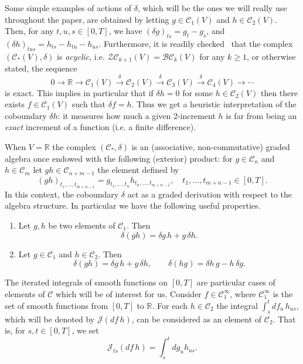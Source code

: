 \documentclass[a4paper,11pt,reqno]{article}
\newcommand{\cB}{\mathcal{B}}
\newcommand{\cZ}{\mathcal{Z}}
\newcommand{\ott}{[0,T]}
\newcommand{\1}{{\bf 1}}
\newcommand{\der}{\delta}
\newcommand{\RR}{\mathbb{R}}
\newcommand{\CC}{\mathcal{C}}
\newcommand{\R}{\mathbb R}
\newcommand{\cj}{\mathcal J}
\begin{document}
Some simple examples of actions of $\der$,
which will be the ones we will really use throughout the paper,
 are obtained by letting 
$g\in\CC_1(V)$ and $h\in\CC_2(V)$. Then, for any $t,u,s\in\ott$, we have
$
  (\der g)_{ts} = g_t - g_s $, and $
(\der h)_{tus} = h_{ts}-h_{tu}-h_{us}
$.
Furthermore, it is readily checked~\cite{MR2091358} that
the complex $(\CC_*(V),\delta)$ is \emph{acyclic}, i.e. 
$\cZ \CC_{k+1}(V) = \cB \CC_{k}(V)$ for any $k\ge 1$, or otherwise stated, 
the sequence
\begin{equation}
\label{eq:exact_sequence}
 0 \rightarrow \RR \rightarrow \CC_1(V)
 \stackrel{\der}{\longrightarrow} \CC_2(V) \stackrel{\der}{\longrightarrow} \CC_3(V) \stackrel{\der}{\longrightarrow} \CC_4(V) \rightarrow \cdots 
\end{equation}
is exact. 
This implies in particular that if $\der h = 0$ for some $h \in \CC_{2}(V)$ then there exists $f \in \CC_{1}(V)$ such that $\der f = h$.
 Thus we get a heuristic 
interpretation of the coboundary $\der h$:  it measures how much a
given 2-increment $h$  is far from being an {\it exact} increment of  a
function (i.e. a finite difference). 

\bigskip
When  $V=\R$ the complex $(\CC_*,\delta)$ is an (associative, non-commutative)
graded algebra once endowed with the following (exterior) product:
for  $g\in\CC_n $ and $h\in\CC_m $ let  $gh \in \CC_{n+m-1} $
the element defined by
\begin{equation}\label{cvpdt}
(gh)_{t_1,\dots,t_{m+n-1}}=
g_{t_1,\dots,t_{n}} h_{t_{n},\dots,t_{m+n-1}},
\quad
t_1,\dots,t_{m+n-1}\in\ott.
\end{equation}
In this context,
the coboundary $\delta$ act as a graded derivation with respect to the
algebra structure. In particular we have the following useful properties.
\begin{enumerate}
\item
Let $g,h$ be two elements of $\CC_1 $. Then
\begin{equation}\label{difrulu}
\der (gh) = \der g\,  h + g\, \der h.
\end{equation}
\item
Let $g \in \CC_1 $ and  $h\in \CC_2 $. Then
$$
\der (gh) = \der g\, h + g \,\der h, \qquad
\der (hg) = \der h\, g  - h \,\der g.
$$
\end{enumerate}
\bigskip

The iterated integrals of smooth functions on $\ott$ are 
particular cases of elements of $\CC$ which will be of interest for
us. Consider $f\in\CC_1^\infty $, where $\CC_1^\infty $ is the set of
smooth functions from $\ott$ to $\R$. For each $h \in \CC_2$ the integral $\int_s^t df_u \,
h_{us}$, which will be denoted by  
$\cj(df \,  h)$, can be considered as an element of
$\CC_{2}$. That is, for $s,t\in\ott$, we set 
$$
\cj_{ts}(df \,  h)
= \int_s^t  dg_u h_{us}.
$$
\end{document}
